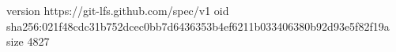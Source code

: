 version https://git-lfs.github.com/spec/v1
oid sha256:021f48cdc31b752dcec0bb7d6436353b4ef6211b033406380b92d93e5f82f19a
size 4827

